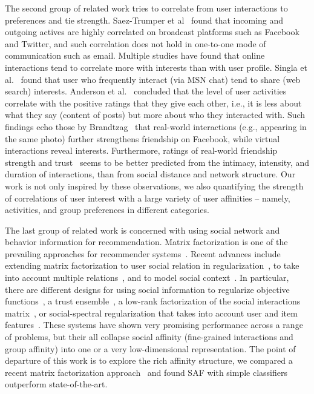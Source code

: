 The second group of related work tries to correlate from user interactions to preferences and tie strength. 
Saez-Trumper et al~\cite{saez2011high} found that incoming and outgoing actives are
highly correlated on broadcast platforms such as Facebook and Twitter,
and such correlation does not hold in one-to-one mode of communication
such as email. Multiple studies have found that online interactions
tend to correlate more with interests than with user profile. Singla et al.~\cite{singla2008yes} found that user who frequently interact (via MSN chat) tend to share (web search) interests. 
Anderson et al.~\cite{Anderson2012} concluded that the level of user activities correlate with the positive ratings that they give each other, i.e., it is less about what they say (content of posts) but more about who they interacted with. Such findings echo those by Brandtzag~\cite{brandtzag2011facebook}
that real-world interactions (e.g., appearing in the same photo) further strengthens friendship on Facebook, while virtual interactions reveal interests. Furthermore, ratings of real-world friendship strength and trust~\cite{gilbert2009predicting} seems to be better predicted from the intimacy, intensity, and duration of interactions, than from social distance and network structure. 
Our work is not only inspired by these observations, we also quantifying the strength of correlations 
of user interest with a large variety of user affinities -- namely, activities, and group preferences in different categories.

The last group of related work is concerned with using social network and behavior information for recommendation. 
Matrix factorization is one of the prevailing approaches for recommender systems~\cite{koren2009matrix,sorec}. Recent advances include extending matrix factorization to user social relation in regularization~\cite{sr,rrmf}, to take into account multiple relations~\cite{tf,Jiang2012SRA},  and to model social context~\cite{Jiang2012SCR}. 
In particular, there are different designs for using social information to regularize objective functions~\cite{lla}, a trust
ensemble~\cite{ste}, a low-rank factorization of the social
interactions matrix~\cite{sorec}, or social-spectral regularization that takes into account user and item features~\cite{Noel2012NOF}.  These systems have shown very promising performance across a range of problems, but their all collapse social affinity (fine-grained interactions and group affinity) into one or a very low-dimensional representation. The point of departure of this work is to explore the rich affinity structure, we compared a recent matrix factorization approach~\cite{Noel2012NOF} and found SAF with simple classifiers outperform state-of-the-art.

